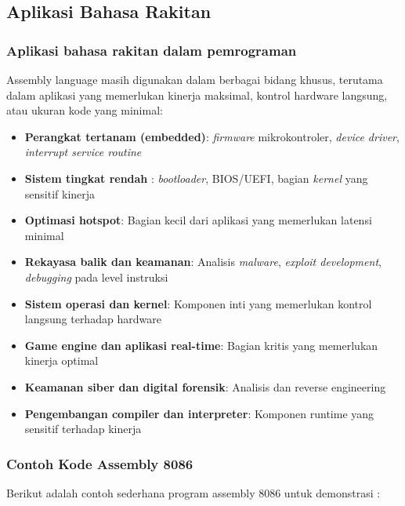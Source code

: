 \documentclass[../main.tex]{subfiles}
\begin{document}
    \subsection{Aplikasi Bahasa Rakitan}\label{subsec:pengenalan-aplikasi}

        \subsubsection{Aplikasi bahasa rakitan dalam pemrograman}
            Assembly language masih digunakan dalam berbagai bidang khusus, terutama dalam aplikasi yang memerlukan kinerja maksimal, kontrol hardware langsung, atau ukuran kode yang minimal:

            \begin{itemize}
                \item \textbf{Perangkat tertanam (embedded)}: \textit{firmware} mikrokontroler, \textit{device driver}, \textit{interrupt service routine}
                \item \textbf{Sistem tingkat rendah }: \textit{bootloader}, BIOS/UEFI, bagian \textit{kernel} yang sensitif kinerja
                \item \textbf{Optimasi hotspot}: Bagian kecil dari aplikasi yang memerlukan latensi minimal
                \item \textbf{Rekayasa balik dan keamanan}: Analisis \textit{malware}, \textit{exploit development}, \textit{debugging} pada level instruksi
                \item \textbf{Sistem operasi dan kernel}: Komponen inti yang memerlukan kontrol langsung terhadap hardware
                \item \textbf{Game engine dan aplikasi real-time}: Bagian kritis yang memerlukan kinerja optimal
                \item \textbf{Keamanan siber dan digital forensik}: Analisis dan reverse engineering
                \item \textbf{Pengembangan compiler dan interpreter}: Komponen runtime yang sensitif terhadap kinerja
            \end{itemize}

        \subsubsection{Contoh Kode Assembly 8086}
            Berikut adalah contoh sederhana program assembly 8086 untuk demonstrasi 
            \cite{susanto1995belajar}:
\end{document}
